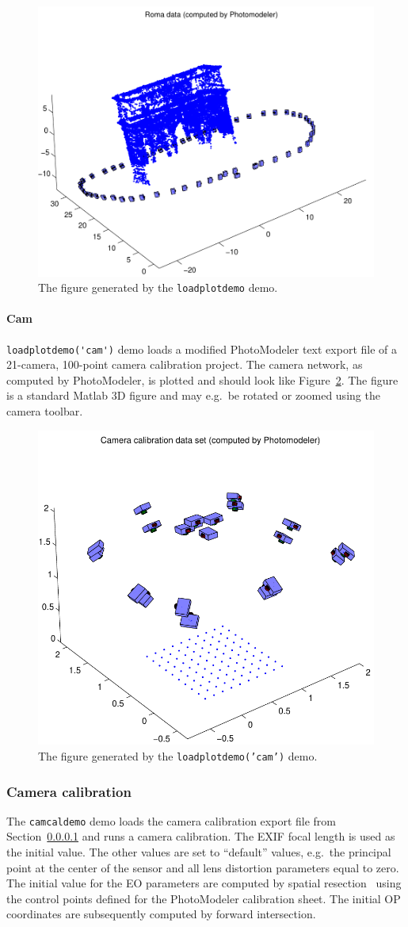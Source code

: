 \documentclass{article}
\begin{document}
\begin{figure}
  \centering
  \includegraphics[width=0.5\hsize]{ill/roma}
  \caption{The figure generated by the \texttt{loadplotdemo} demo.}
  \label{fig:roma}
\end{figure}

\paragraph{\sc Cam}
\label{sec:camcaldata}
\verb+loadplotdemo('cam')+ demo loads a modified PhotoModeler text
export file of a 21-camera, 100-point camera calibration project. The
camera network, as computed by PhotoModeler, is plotted and should
look like Figure~\ref{fig:camcalib}. The figure is a standard Matlab
3D figure and may e.g.\ be rotated or zoomed using the camera toolbar.

\begin{figure}
  \centering
  \includegraphics[width=0.45\hsize]{ill/ccam}
  \caption{The figure generated by the \texttt{loadplotdemo('cam')} demo.}
  \label{fig:camcalib}
\end{figure}

\subsubsection{Camera calibration}

The \verb+camcaldemo+ demo loads the camera calibration export file
from Section~\ref{sec:camcaldata} and runs a camera calibration. The
EXIF focal length is used as the initial value. The other values are
set to ``default'' values, e.g.\ the principal point at the center of
the sensor and all lens distortion parameters equal to zero. The
initial value for the EO parameters are computed by spatial
resection~\citep[Chap.~11.1.3.4]{Haralick1994:Review,McGlone2004:Manual} using
the control points defined for the PhotoModeler calibration sheet. The
initial OP coordinates are subsequently computed by forward
intersection.
\end{document}

